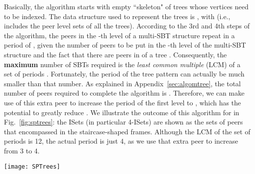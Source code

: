 \documentclass[conference]{IEEEtran}
\begin{document}
  Basically, the algorithm starts with empty ``skeleton" of trees whose vertices need to be indexed. The data structure used to represent the trees is , with  (i.e.,  includes the peer level sets of all the trees). According to the 3rd and 4th steps of the algorithm, the peers in the -th level of a multi-SBT structure repeat in a  period of , given the number  of peers to be put in the -th level of the multi-SBT structure and the fact that there are  peers in  of a tree . Consequently, the \textbf{maximum} number of SBTs required is the \textit{least common multiple} (LCM) of a set of periods . Fortunately, the period  of the tree pattern can actually be much smaller than that number. As explained in Appendix~\ref{sec:algomtree}, the total number of peers required to complete the algorithm is . Therefore, we can make use of this extra peer to increase the period of the first level to , which has the potential to greatly reduce . We illustrate the outcome of this algorithm for  in Fig.~\ref{fig:sptrees}: the ISets (in particular 4-ISets) are shown as the sets of peers that encompassed in the staircase-shaped frames. Although the LCM of the set of periods  is 12, the actual period is just 4, as we use that extra peer to increase  from 3 to 4.
\begin{figure*}[t]
   \begin{center}
        \texttt{[image: SPTrees]}
    \caption{The multi-SBT structure, -ISet, and corresponding uploading schedules for . The correspondence between an SBT and the scheduled uploadings below it is such that these concurrent uploadings take place exactly when the server pushes a chunk to the root of this tree.} \label{fig:sptrees}
   \end{center}
  \end{figure*}
\end{document}
